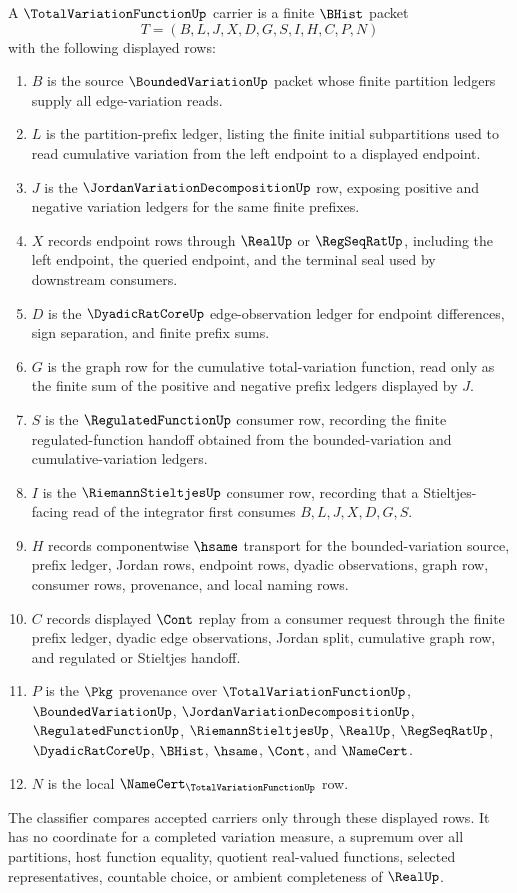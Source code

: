 \begin{definition}
\label{def:total-variation-function-carrier}
A $\TotalVariationFunctionUp$ carrier is a finite $\BHist$ packet
$$
T=(B,L,J,X,D,G,S,I,H,C,P,N)
$$
with the following displayed rows:
\begin{enumerate}
\item $B$ is the source $\BoundedVariationUp$ packet whose finite partition ledgers supply all edge-variation reads.
\item $L$ is the partition-prefix ledger, listing the finite initial subpartitions used to read cumulative variation from the left endpoint to a displayed endpoint.
\item $J$ is the $\JordanVariationDecompositionUp$ row, exposing positive and negative variation ledgers for the same finite prefixes.
\item $X$ records endpoint rows through $\RealUp$ or $\RegSeqRatUp$, including the left endpoint, the queried endpoint, and the terminal seal used by downstream consumers.
\item $D$ is the $\DyadicRatCoreUp$ edge-observation ledger for endpoint differences, sign separation, and finite prefix sums.
\item $G$ is the graph row for the cumulative total-variation function, read only as the finite sum of the positive and negative prefix ledgers displayed by $J$.
\item $S$ is the $\RegulatedFunctionUp$ consumer row, recording the finite regulated-function handoff obtained from the bounded-variation and cumulative-variation ledgers.
\item $I$ is the $\RiemannStieltjesUp$ consumer row, recording that a Stieltjes-facing read of the integrator first consumes $B,L,J,X,D,G,S$.
\item $H$ records componentwise $\hsame$ transport for the bounded-variation source, prefix ledger, Jordan rows, endpoint rows, dyadic observations, graph row, consumer rows, provenance, and local naming rows.
\item $C$ records displayed $\Cont$ replay from a consumer request through the finite prefix ledger, dyadic edge observations, Jordan split, cumulative graph row, and regulated or Stieltjes handoff.
\item $P$ is the $\Pkg$ provenance over $\TotalVariationFunctionUp$, $\BoundedVariationUp$, $\JordanVariationDecompositionUp$, $\RegulatedFunctionUp$, $\RiemannStieltjesUp$, $\RealUp$, $\RegSeqRatUp$, $\DyadicRatCoreUp$, $\BHist$, $\hsame$, $\Cont$, and $\NameCert$.
\item $N$ is the local $\NameCert_{\TotalVariationFunctionUp}$ row.
\end{enumerate}
The classifier compares accepted carriers only through these displayed rows. It has no coordinate for a completed variation measure, a supremum over all partitions, host function equality, quotient real-valued functions, selected representatives, countable choice, or ambient completeness of $\RealUp$.
\end{definition}

